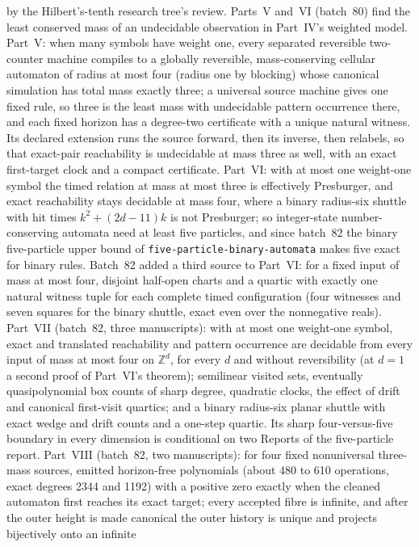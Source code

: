 \documentclass[11pt]{article}
\newcommand{\dir}[1]{\texttt{#1}}
\begin{document}
{by the Hilbert's-tenth research tree's review.  Parts~V and~VI (batch~80)
find the least conserved mass of an undecidable observation in Part~IV's
weighted model.  Part~V: when many symbols have weight one, every separated
reversible two-counter machine compiles to a globally reversible,
mass-conserving cellular automaton of radius at most four (radius one by
blocking) whose canonical simulation has total mass exactly three; a
universal source machine gives one fixed rule, so three is the least mass
with undecidable pattern occurrence there, and each fixed horizon has a
degree-two certificate with a unique natural witness.  Its declared
extension runs the source forward, then its inverse, then relabels, so that
exact-pair reachability is undecidable at mass three as well, with an exact
first-target clock and a compact certificate.  Part~VI: with at most one
weight-one symbol the timed relation at mass at most three is effectively
Presburger, and exact reachability stays decidable at mass four, where a
binary radius-six shuttle with hit times $k^2+(2d-11)k$ is not Presburger;
so integer-state number-conserving automata need at least five particles,
and since batch~82 the binary five-particle upper bound of
\dir{five-particle-binary-automata} makes five exact for binary rules.
Batch~82 added a third source to Part~VI: for a fixed input of mass at most
four, disjoint half-open charts and a quartic with exactly one natural
witness tuple for each complete timed configuration (four witnesses and
seven squares for the binary shuttle, exact even over the nonnegative
reals).  Part~VII (batch~82, three manuscripts): with at most one
weight-one symbol, exact and translated reachability and pattern occurrence
are decidable from every input of mass at most four on $\mathbb Z^d$, for
every $d$ and without reversibility (at $d=1$ a second proof of Part~VI's
theorem); semilinear visited sets, eventually quasipolynomial box counts of
sharp degree, quadratic clocks, the effect of drift and canonical
first-visit quartics; and a binary radius-six planar shuttle with exact
wedge and drift counts and a one-step quartic.  Its sharp four-versus-five
boundary in every dimension is conditional on two Reports of the
five-particle report.  Part~VIII (batch~82, two manuscripts): for four fixed
nonuniversal three-mass sources, emitted horizon-free polynomials (about 480
to 610 operations, exact degrees 2344 and 1192) with a positive zero
exactly when the cleaned automaton first reaches its exact target; every
accepted fibre is infinite, and after the outer height is made canonical
the outer history is unique and projects bijectively onto an infinite
}
\end{document}
